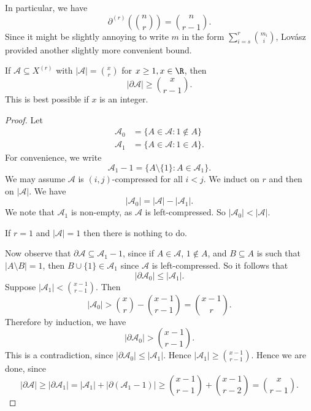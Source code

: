 \documentclass[a4paper]{article}
\begin{document}
In particular, we have
\[
  \partial^{(r)}\left(\binom{n}{r}\right) = \binom{n}{r - 1}.
\]
Since it might be slightly annoying to write $m$ in the form $\sum_{i = s}^r \binom{m_i}{i}$, Lov\'asz provided another slightly more convenient bound.
\begin{thm}
  If $\mathcal{A} \subseteq X^{(r)}$ with $|\mathcal{A}| = \binom{x}{r}$ for $x \geq 1, x \in \R$, then
  \[
    |\partial \mathcal{A}| \geq \binom{x}{r - 1}.
  \]
  This is best possible if $x$ is an integer.
\end{thm}

\begin{proof}
  Let
  \begin{align*}
    \mathcal{A}_0 &= \{A \in \mathcal{A}: 1 \not \in A\}\\
    \mathcal{A}_1 &= \{A \in \mathcal{A}: 1 \in A\}.
  \end{align*}
  For convenience, we write
  \[
    \mathcal{A}_1 - 1 = \{A \setminus \{1\}: A \in \mathcal{A}_1\}.
  \]
  We may assume $\mathcal{A}$ is $(i, j)$-compressed for all $i < j$. We induct on $r$ and then on $|\mathcal{A}|$. We have
  \[
    |\mathcal{A}_0| = |\mathcal{A}| - |\mathcal{A}_1|.
  \]
  We note that $\mathcal{A}_1$ is non-empty, as $\mathcal{A}$ is left-compressed. So $|\mathcal{A}_0| < |\mathcal{A}|$.

  If $r = 1$ and $|\mathcal{A}| = 1$ then there is nothing to do.

  Now observe that $\partial \mathcal{A} \subseteq \mathcal{A}_1 - 1$, since if $A \in \mathcal{A}$, $1 \not \in A$, and $B \subseteq A$ is such that $|A \setminus B| = 1$, then $B \cup \{1\} \in \mathcal{A}_1$ since $\mathcal{A}$ is left-compressed. So it follows that
  \[
    |\partial \mathcal{A}_0| \leq |\mathcal{A}_1|.
  \]
  Suppose $|\mathcal{A}_1| < \binom{x - 1}{r - 1}$. Then
  \[
    |\mathcal{A}_0| > \binom{x}{r} - \binom{x - 1}{r - 1} = \binom{x - 1}{r}.
  \]
  Therefore by induction, we have
  \[
    |\partial \mathcal{A}_0| > \binom{x - 1}{r - 1}.
  \]
  This is a contradiction, since $|\partial \mathcal{A}_0| \leq |\mathcal{A}_1|$. Hence $|\mathcal{A}_1| \geq \binom{x - 1}{r - 1}$. Hence we are done, since
  \[
    |\partial \mathcal{A}| \geq |\partial \mathcal{A}_1| = |\mathcal{A}_1| + |\partial (\mathcal{A}_1 - 1)| \geq \binom{x - 1}{r - 1} + \binom{x - 1}{r - 2} = \binom{x}{r - 1}.
  \]
\end{proof}

%
%
%
\end{document}
